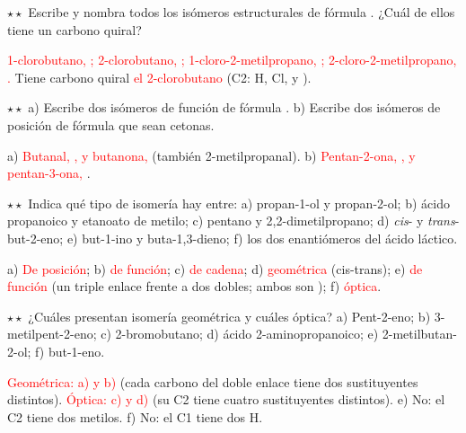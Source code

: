 \begin{exercise}
    \(\star\star\) Escribe y nombra todos los isómeros estructurales de fórmula . ¿Cuál de ellos tiene un carbono quiral?
    \begin{solu}
        \textcolor{red}{1-clorobutano, ; 2-clorobutano, ; 1-cloro-2-metilpropano,
        ; 2-cloro-2-metilpropano, .} Tiene carbono quiral \textcolor{red}{el 2-clorobutano}
        (C2: H, Cl,  y ).
    \end{solu}
\end{exercise}

\begin{exercise}
    \(\star\star\) a) Escribe dos isómeros de función de fórmula . b) Escribe dos isómeros de posición de fórmula
     que sean cetonas.
    \begin{solu}
        a) \textcolor{red}{Butanal, , y butanona, } (también 2-metilpropanal).
        b) \textcolor{red}{Pentan-2-ona, , y pentan-3-ona, }.
    \end{solu}
\end{exercise}

\begin{exercise}
    \(\star\star\) Indica qué tipo de isomería hay entre: a) propan-1-ol y propan-2-ol; b) ácido propanoico y etanoato de metilo;
    c) pentano y 2,2-dimetilpropano; d) \emph{cis}- y \emph{trans}-but-2-eno; e) but-1-ino y buta-1,3-dieno; f) los dos
    enantiómeros del ácido láctico.
    \begin{solu}
        a) \textcolor{red}{De posición}; b) \textcolor{red}{de función}; c) \textcolor{red}{de cadena}; d) \textcolor{red}{geométrica}
        (cis-trans); e) \textcolor{red}{de función} (un triple enlace frente a dos dobles; ambos son ); f)
        \textcolor{red}{óptica}.
    \end{solu}
\end{exercise}

\begin{exercise}
    \(\star\star\) ¿Cuáles presentan isomería geométrica y cuáles óptica? a) Pent-2-eno; b) 3-metilpent-2-eno; c) 2-bromobutano; d)
    ácido 2-aminopropanoico; e) 2-metilbutan-2-ol; f) but-1-eno.
    \begin{solu}
        \textcolor{red}{Geométrica: a) y b)} (cada carbono del doble enlace tiene dos sustituyentes distintos).
        \textcolor{red}{Óptica: c) y d)} (su C2 tiene cuatro sustituyentes distintos). e) No: el C2 tiene dos metilos. f) No: el C1
        tiene dos H.
    \end{solu}
\end{exercise}

